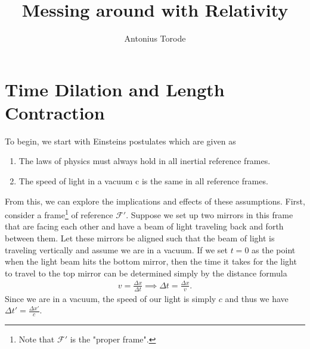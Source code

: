 \documentclass[11pt]{article}
\title{Messing around with Relativity}
\author{Antonius Torode}
\theoremstyle{definition}
\begin{document}
\maketitle

\section{Time Dilation and Length Contraction}
To begin, we start with Einsteins postulates which are given as
\begin{enumerate}
	\item The laws of physics must always hold in all inertial reference frames.
	\item The speed of light in a vacuum c is the same in all reference frames.
\end{enumerate}
From this, we can explore the implications and effects of these assumptions. First, consider a frame\footnote{Note that $\mathcal{F}'$ is the "proper frame".} of reference $\mathcal{F}'$. Suppose we set up two mirrors in this frame that are facing each other and have a beam of light traveling back and forth between them. Let these mirrors be aligned such that the beam of light is traveling vertically and assume we are in a vacuum. If we set $t=0$ as the point when the light beam hits the bottom mirror, then the time it takes for the light to travel to the top mirror can be determined simply by the distance formula \begin{align}
v=\frac{\Delta x}{\Delta t} \implies \Delta t = \frac{\Delta x}{v}. \label{v=d/t}
\end{align} 
Since we are in a vacuum, the speed of our light is simply $c$ and thus we have $\Delta t' = \frac{\Delta x'}{c}$. 
\end{document}
